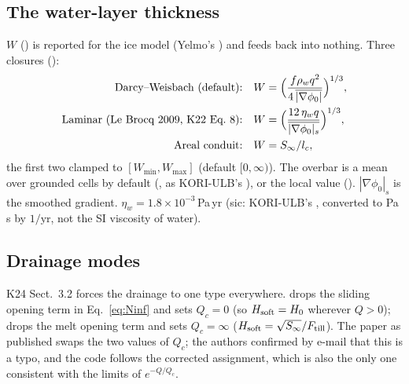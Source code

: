 \subsection{The water-layer thickness}\label{phys:W}
$W$ () is reported for the ice model (Yelmo's ) and feeds back into nothing. Three closures
():
\begin{align}
\text{Darcy--Weisbach (default):}\quad & W = \Bigl(\frac{f{\rho_w} q^2}{4\,\overline{|\nabla\phi_0|}}\Bigr)^{1/3},\\
\text{Laminar (Le Brocq 2009, K22 Eq.~8):}\quad & W = \Bigl(\frac{12\,\eta_w q}{\overline{|\nabla\phi_0|_s}}\Bigr)^{1/3},\\
\text{Areal conduit:}\quad & W = {S_\infty}/l_c,
\end{align}
the first two clamped to $[W_{\min}, W_{\max}]$ (default $[0,\infty)$). The overbar is a mean over grounded cells by
default (, as KORI-ULB's ), or the local value ().
$|\nabla\phi_0|_s$ is the smoothed gradient. $\eta_w = 1.8\times10^{-3}$\,Pa\,yr (sic: KORI-ULB's
, converted to Pa\,s by $1/\text{yr}$, not the SI viscosity of water).

\subsection{Drainage modes}\label{phys:drainage}
K24 Sect.~3.2 forces the drainage to one type everywhere.  drops the sliding opening term in
Eq.~\eqref{eq:Ninf} and sets $Q_c = 0$ (so $H_{\rm soft} = H_0$ wherever $Q>0$);  drops the
melt opening term and sets $Q_c = \infty$ ($H_{\rm soft} = \sqrt{{S_\infty}}/F_{\rm till}$). The paper as published swaps
the two values of $Q_c$; the authors confirmed by e-mail that this is a typo, and the code follows the corrected
assignment, which is also the only one consistent with the limits of $e^{-Q/Q_c}$.

